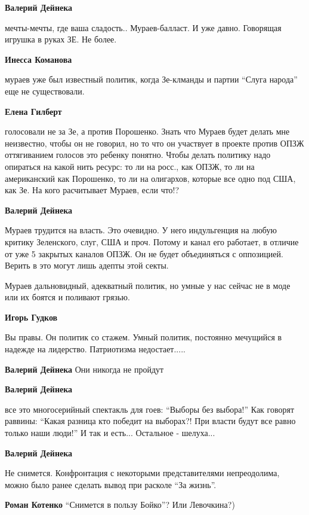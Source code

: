 \begin{itemize}
\begin{itemize}
\textbf{Валерий Дейнека}

мечты-мечты, где ваша сладость..
Мураев-балласт. И уже давно. Говорящая игрушка в руках ЗЕ. Не более.

\textbf{Инесса Команова}

мураев уже был известный политик, когда Зе-клманды и партии \enquote{Слуга народа} еще
не существовали.

\textbf{Елена Гилберт} 

голосовали не за Зе, а против Порошенко. Знать что Мураев будет делать мне
неизвестно, чтобы он не говорил, но то что он участвует в проекте против ОПЗЖ
оттягиванием голосов это ребенку понятно. Чтобы делать политику надо опираться
на какой нить ресурс: то ли на росс., как ОПЗЖ, то ли на американский как
Порошенко, то ли на олигархов, которые все одно под США, как Зе. На кого
расчитывает Мураев, если что!?

\textbf{Валерий Дейнека} 

Мураев трудится на власть. Это очевидно.
У него индульгенция на любую критику Зеленского, слуг, США и проч.
Потому и канал его работает, в отличие от уже 5 закрытых каналов ОПЗЖ.
Он не будет объединяться с оппозицией.
Верить в это могут лишь адепты этой секты.


Мураев дальновидный, адекватный политик, но умные у нас сейчас не в моде или их
боятся и поливают грязью.

\textbf{Игорь Гудков}

Вы правы. Он политик со стажем. Умный политик, постоянно мечущийся в надежде на
лидерство. Патриотизма недостает.....

\textbf{Валерий Дейнека} Они никогда не пройдут

\textbf{Валерий Дейнека} 

все это многосерийный спектакль для гоев: \enquote{Выборы без выбора!}
Как говорят раввины: \enquote{Какая разница кто победит на выборах?! При власти будут все равно только наши люди!}
И так и есть... Остальное - шелуха...

\textbf{Валерий Дейнека} 

Не снимется. Конфронтация с некоторыми представителями непреодолима, можно было
ранее сделать вывод при расколе \enquote{За жизнь}.

\textbf{Роман Котенко} \enquote{Снимется в пользу Бойко}? Или Левочкина?)


\end{itemize}
\end{itemize}
